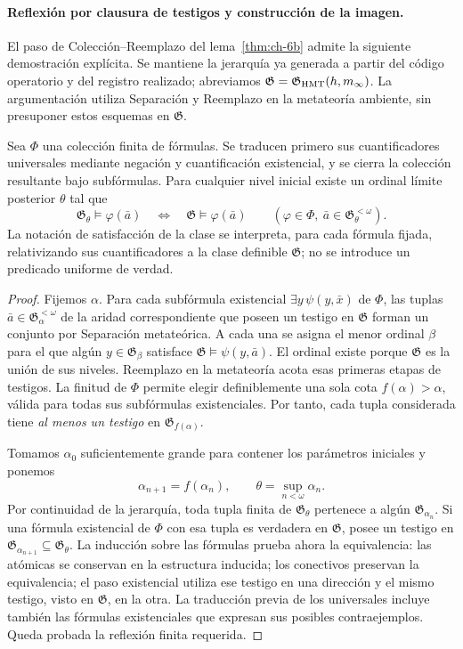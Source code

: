 \paragraph{Reflexión por clausura de testigos y construcción de la imagen.}
El paso de Colección--Reemplazo del lema~\ref{thm:ch-6b} admite la siguiente
demostración explícita. Se mantiene la jerarquía ya generada a partir del
código operatorio y del registro realizado; abreviamos
\(\mathfrak G=\mathfrak G_{\rm HMT}(h,m_\infty)\).
La argumentación utiliza Separación y Reemplazo en la metateoría ambiente,
sin presuponer estos esquemas en \(\mathfrak G\).

Sea \(\Phi\) una colección finita de fórmulas. Se traducen primero sus
cuantificadores universales mediante negación y cuantificación existencial,
y se cierra la colección resultante bajo subfórmulas. Para cualquier nivel
inicial existe un ordinal límite posterior \(\theta\) tal que
\[
 \mathfrak G_\theta\models\varphi(\bar a)
 \quad\Longleftrightarrow\quad
 \mathfrak G\models\varphi(\bar a)
 \qquad
 (\varphi\in\Phi,\ \bar a\in\mathfrak G_\theta^{<\omega}).
\]
La notación de satisfacción de la clase se interpreta, para cada fórmula
fijada, relativizando sus cuantificadores a la clase definible
\(\mathfrak G\); no se introduce un predicado uniforme de verdad.

\begin{proof}
Fijemos \(\alpha\). Para cada subfórmula existencial
\(\exists y\,\psi(y,\bar x)\) de \(\Phi\), las tuplas
\(\bar a\in\mathfrak G_\alpha^{<\omega}\) de la aridad correspondiente
que poseen un testigo en \(\mathfrak G\) forman un conjunto por Separación
metateórica. A cada una se asigna el menor ordinal \(\beta\) para el que
algún \(y\in\mathfrak G_\beta\) satisface
\(\mathfrak G\models\psi(y,\bar a)\). El ordinal existe porque
\(\mathfrak G\) es la unión de sus niveles. Reemplazo en la metateoría
acota esas primeras etapas de testigos. La finitud de \(\Phi\) permite
elegir definiblemente una sola cota \(f(\alpha)>\alpha\), válida para
todas sus subfórmulas existenciales. Por tanto, cada tupla considerada tiene
\emph{al menos un testigo} en \(\mathfrak G_{f(\alpha)}\).

Tomamos \(\alpha_0\) suficientemente grande para contener los parámetros
iniciales y ponemos
\[
 \alpha_{n+1}=f(\alpha_n),\qquad
 \theta=\sup_{n<\omega}\alpha_n.
\]
Por continuidad de la jerarquía, toda tupla finita de
\(\mathfrak G_\theta\) pertenece a algún \(\mathfrak G_{\alpha_n}\).
Si una fórmula existencial de \(\Phi\) con esa tupla es verdadera en
\(\mathfrak G\), posee un testigo en
\(\mathfrak G_{\alpha_{n+1}}\subseteq\mathfrak G_\theta\).
La inducción sobre las fórmulas prueba ahora la equivalencia: las atómicas
se conservan en la estructura inducida; los conectivos preservan la
equivalencia; el paso existencial utiliza ese testigo en una dirección y el
mismo testigo, visto en \(\mathfrak G\), en la otra. La traducción previa
de los universales incluye también las fórmulas existenciales que expresan
sus posibles contraejemplos. Queda probada la reflexión finita requerida.
\end{proof}

